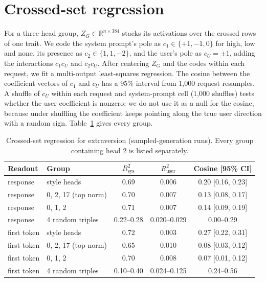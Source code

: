 \section{Crossed-set regression}
\label{app:regression}
For a three-head group, $Z_G \in \mathbb{R}^{n \times 384}$ stacks its activations over the crossed rows of one trait. We code the system prompt's pole as $c_1 \in \{+1, -1, 0\}$ for high, low and none, its presence as $c_2 \in \{1, 1, -2\}$, and the user's pole as $c_U = \pm 1$, adding the interactions $c_1 c_U$ and $c_2 c_U$. After centering $Z_G$ and the codes within each request, we fit a multi-output least-squares regression. The cosine between the coefficient vectors of $c_1$ and $c_U$ has a 95\% interval from 1,000 request resamples. A shuffle of $c_U$ within each request and system-prompt cell (1,000 shuffles) tests whether the user coefficient is nonzero; we do not use it as a null for the cosine, because under shuffling the coefficient keeps pointing along the true user direction with a random sign. Table~\ref{tab:regression} gives every group.

\begin{table}[h]
\centering
\small
\setlength{\tabcolsep}{4pt}
\begin{tabular}{@{}llccc@{}}
\toprule
Readout & Group & $R^2_{\text{sys}}$ & $R^2_{\text{user}}$ & Cosine [95\% CI] \\
\midrule
response & style heads & 0.69 & 0.006 & 0.20 [0.16, 0.23] \\
response & 0, 2, 17 (top norm) & 0.70 & 0.007 & 0.13 [0.08, 0.17] \\
response & 0, 1, 2 & 0.71 & 0.007 & 0.14 [0.09, 0.19] \\
response & 4 random triples & 0.22--0.28 & 0.020--0.029 & 0.00--0.29 \\
first token & style heads & 0.72 & 0.003 & 0.27 [0.22, 0.31] \\
first token & 0, 2, 17 (top norm) & 0.65 & 0.010 & 0.08 [0.03, 0.12] \\
first token & 0, 1, 2 & 0.70 & 0.008 & 0.07 [0.01, 0.12] \\
first token & 4 random triples & 0.10--0.40 & 0.024--0.125 & 0.24--0.56 \\
\bottomrule
\end{tabular}
\caption{Crossed-set regression for extraversion (sampled-generation runs). Every group containing head 2 is listed separately.}
\label{tab:regression}
\end{table}

